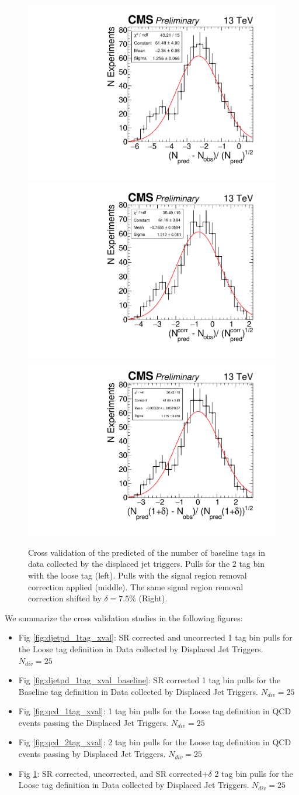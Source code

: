 \begin{figure}
\begin{center}
\includegraphics[width=.31\textwidth]{figures/an/ANALYSIS/pulls/data_loose_uncorrected_2tag.pdf}
\includegraphics[width=.31\textwidth]{figures/an/ANALYSIS/pulls/data_loose_corrected_2tag.pdf}
\includegraphics[width=.31\textwidth]{figures/an/ANALYSIS/pulls/data_loose_corrected_delta0p075_2tag.pdf}
\caption{Cross validation of the predicted of the number of baseline tags in data collected by the displaced jet triggers. Pulls for the 2 tag bin with the loose tag (left). Pulls with the signal region removal correction applied (middle). The same signal region removal correction shifted by $\delta=7.5\%$  (Right). 
\label{fig:djetpd_2tag_xval}}
\end{center}
\end{figure}


We summarize the cross validation studies in the following figures:
\begin{itemize}
\item Fig \ref{fig:djetpd_1tag_xval}: SR corrected and uncorrected 1 tag bin pulls for the Loose tag definition in Data collected by Displaced Jet Triggers. $N_{div}=25$
\item Fig \ref{fig:djetpd_1tag_xval_baseline}: SR corrected 1 tag bin pulls for the Baseline tag definition in Data collected by Displaced Jet Triggers. $N_{div}=25$
\item Fig \ref{fig:qcd_1tag_xval}: 1 tag bin pulls for the Loose tag definition in QCD events passing the Displaced Jet Triggers. $N_{div}=25$
\item Fig \ref{fig:qcd_2tag_xval}: 2 tag bin pulls for the Loose tag definition in QCD events passing by Displaced Jet Triggers. $N_{div}=25$
\item Fig \ref{fig:djetpd_2tag_xval}: SR corrected, uncorrected, and SR corrected+$\delta$ 2 tag bin pulls for the Loose tag definition in Data collected by Displaced Jet Triggers. $N_{div}=25$
\end{itemize}

